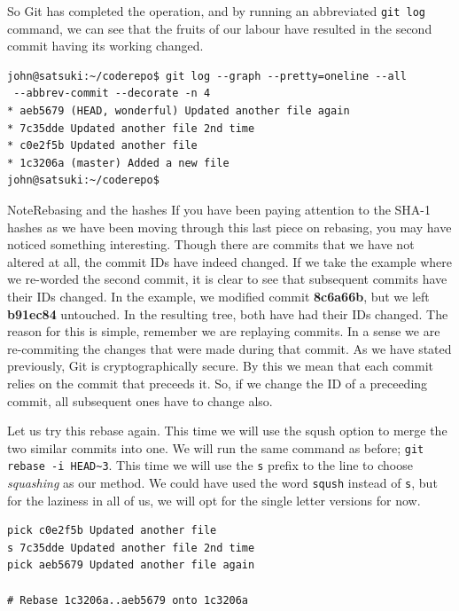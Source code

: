 So Git has completed the operation, and by running an abbreviated \texttt{git log} command, we can see that the fruits of our labour have resulted in the second commit having its working changed.

\begin{Verbatim}
john@satsuki:~/coderepo$ git log --graph --pretty=oneline --all 
 --abbrev-commit --decorate -n 4
* aeb5679 (HEAD, wonderful) Updated another file again
* 7c35dde Updated another file 2nd time
* c0e2f5b Updated another file
* 1c3206a (master) Added a new file
john@satsuki:~/coderepo$ 
\end{Verbatim}

\begin{callout}{Note}{Rebasing and the hashes}
If you have been paying attention to the SHA-1 hashes as we have been moving through this last piece on rebasing, you may have noticed something interesting.  Though there are commits that we have not altered at all, the commit IDs have indeed changed.  If we take the example where we re-worded the second commit, it is clear to see that subsequent commits have their IDs changed.  In the example, we modified commit \textbf{8c6a66b}, but we left \textbf{b91ec84} untouched.  In the resulting tree, both have had their IDs changed.
\newline
\newline
The reason for this is simple, remember we are replaying commits.  In a sense we are re-commiting the changes that were made during that commit.  As we have stated previously, Git is cryptographically secure.  By this we mean that each commit relies on the commit that preceeds it.  So, if we change the ID of a preceeding commit, all subsequent ones have to change also.
\end{callout}

Let us try this rebase again.  This time we will use the sqush option to merge the two similar commits into one.  We will run the same command as before; \texttt{git rebase -i HEAD\textasciitilde3}.  This time we will use the \texttt{s} prefix to the line to choose \emph{squashing} as our method.  We could have used the word \texttt{sqush} instead of \texttt{s}, but for the laziness in all of us, we will opt for the single letter versions for now.

\begin{Verbatim}
pick c0e2f5b Updated another file
s 7c35dde Updated another file 2nd time
pick aeb5679 Updated another file again

# Rebase 1c3206a..aeb5679 onto 1c3206a
\end{Verbatim}

